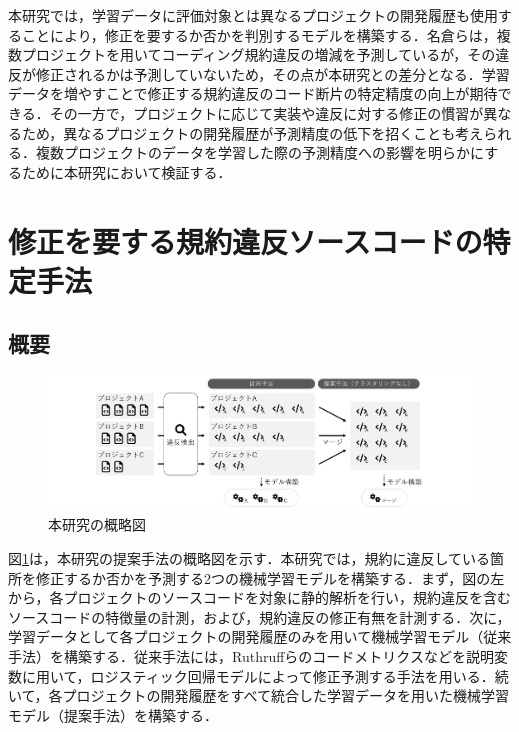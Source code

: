 \documentclass[T,J]{fose} %
\begin{document}
本研究では，学習データに評価対象とは異なるプロジェクトの開発履歴も使用することにより，修正を要するか否かを判別するモデルを構築する．名倉らは，複数プロジェクトを用いてコーディング規約違反の増減を予測しているが，その違反が修正されるかは予測していないため，その点が本研究との差分となる\cite{nagura}．学習データを増やすことで修正する規約違反のコード断片の特定精度の向上が期待できる．その一方で，プロジェクトに応じて実装や違反に対する修正の慣習が異なるため，異なるプロジェクトの開発履歴が予測精度の低下を招くことも考えられる．複数プロジェクトのデータを学習した際の予測精度への影響を明らかにするために本研究において検証する．


\section{修正を要する規約違反ソースコードの特定手法}\label{sec:approach}

\subsection{概要}
\begin{figure}[t]
	\centering
	\includegraphics[width=1.0\linewidth]{Kameoka_fig/kameoka_fig1_bw.pdf}
	\caption{本研究の概略図}
	\label{fig:Teiannsyuhou}
\end{figure}

図\ref{fig:Teiannsyuhou}は，本研究の提案手法の概略図を示す．本研究では，規約に違反している箇所を修正するか否かを予測する2つの機械学習モデルを構築する．まず，図の左から，各プロジェクトのソースコードを対象に静的解析を行い，規約違反を含むソースコードの特徴量の計測，および，規約違反の修正有無を計測する．次に，学習データとして各プロジェクトの開発履歴のみを用いて機械学習モデル（従来手法）を構築する．従来手法には，Ruthruffらのコードメトリクスなどを説明変数に用いて，ロジスティック回帰モデルによって修正予測する手法を用いる\cite{JyuraiPre}．続いて，各プロジェクトの開発履歴をすべて統合した学習データを用いた機械学習モデル（提案手法）を構築する．
\end{document}
